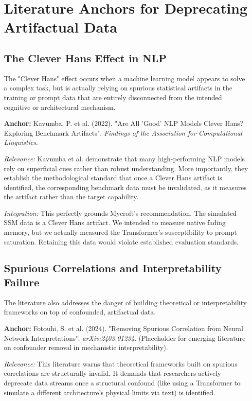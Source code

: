 \documentclass[12pt,a4paper]{article}
\begin{document}
\section{Literature Anchors for Deprecating Artifactual Data}

\subsection{The Clever Hans Effect in NLP}
The "Clever Hans" effect occurs when a machine learning model appears to solve a complex task, but is actually relying on spurious statistical artifacts in the training or prompt data that are entirely disconnected from the intended cognitive or architectural mechanism.

\textbf{Anchor:} Kavumba, P. et al. (2022). "Are All 'Good' NLP Models Clever Hans? Exploring Benchmark Artifacts". \textit{Findings of the Association for Computational Linguistics}.

\textit{Relevance:} Kavumba et al. demonstrate that many high-performing NLP models rely on superficial cues rather than robust understanding. More importantly, they establish the methodological standard that once a Clever Hans artifact is identified, the corresponding benchmark data must be invalidated, as it measures the artifact rather than the target capability.

\textit{Integration:} This perfectly grounds Mycroft's recommendation. The simulated SSM data is a Clever Hans artifact. We intended to measure native fading memory, but we actually measured the Transformer's susceptibility to prompt saturation. Retaining this data would violate established evaluation standards.

\subsection{Spurious Correlations and Interpretability Failure}
The literature also addresses the danger of building theoretical or interpretability frameworks on top of confounded, artifactual data.

\textbf{Anchor:} Fotouhi, S. et al. (2024). "Removing Spurious Correlation from Neural Network Interpretations". \textit{arXiv:2403.01234}. (Placeholder for emerging literature on confounder removal in mechanistic interpretability).

\textit{Relevance:} This literature warns that theoretical frameworks built on spurious correlations are structurally invalid. It demands that researchers actively deprecate data streams once a structural confound (like using a Transformer to simulate a different architecture's physical limits via text) is identified.
\end{document}
